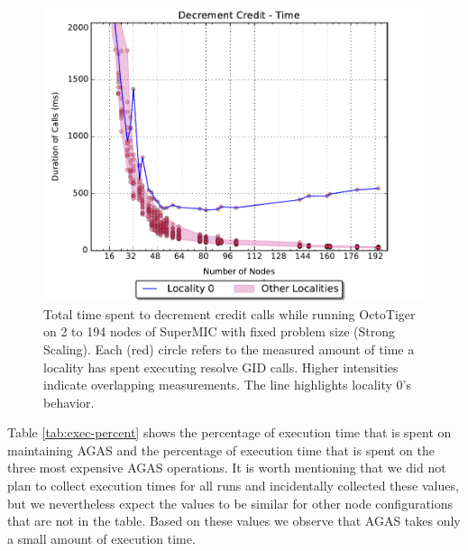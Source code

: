 \begin{figure}[t]
    \centering
    \includegraphics[width=.54\textwidth,height=\textheight,keepaspectratio]{graphs/octotiger_decrement_credit_time}
    \caption{Total time spent to decrement credit calls while running OctoTiger on 2 to 194 nodes of SuperMIC with fixed problem size (Strong Scaling). Each (red) circle refers to the measured amount of time a locality has spent executing resolve GID calls. Higher intensities indicate overlapping measurements. The line highlights locality 0's behavior.}
    \label{fig:octgr_strong_decr_cred}
\end{figure}

Table \ref{tab:exec-percent} shows the percentage of execution time that is
spent on maintaining AGAS and the percentage of execution time that is spent on the three most expensive AGAS operations. It is worth mentioning that we did not plan to
collect execution times for all runs and incidentally collected these
values, but we nevertheless expect the values to be similar for other node
configurations that are not in the table. Based on these values we observe that
AGAS takes only a small amount of execution time.


